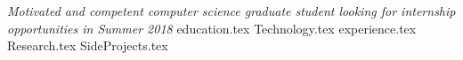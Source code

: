 \documentclass[10pt, a4paper]{awesome-cv}
\newcommand*{\sectiondir}{resume/}
\begin{document}
\makecvheader

\textit{Motivated and competent computer science graduate student looking for internship opportunities in Summer 2018}
{education.tex}
{Technology.tex}
{experience.tex}
{Research.tex}
{SideProjects.tex}

\end{document}
